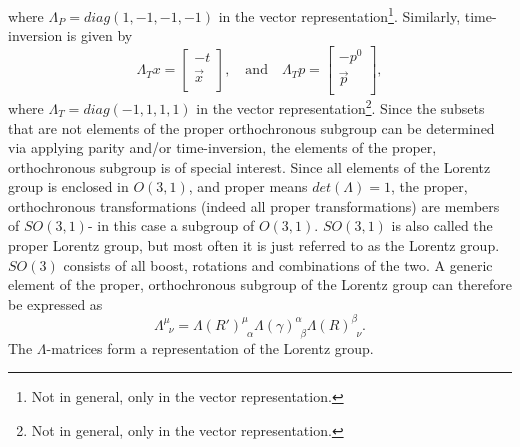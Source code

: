 where $\Lambda_P=diag(1,-1,-1,-1)$ in the vector representation\footnote{Not in general, only in the vector representation.}. Similarly, time-inversion is given by
\begin{equation}
	\Lambda_T x=\begin{bmatrix}
		-t\\
		\vec{x}\\
	\end{bmatrix}, \quad \text{and} \quad  \Lambda_Tp=\begin{bmatrix}
		-p^0\\
		\vec{p}\\
	\end{bmatrix},
\end{equation} 
where $\Lambda_T=diag(-1,1,1,1)$ in the vector representation\footnote{Not in general, only in the vector representation.}. Since the subsets that are not elements of the proper orthochronous subgroup can be determined via applying parity and/or time-inversion, the elements of the proper, orthochronous subgroup is of special interest. Since all elements of the Lorentz group is enclosed in $O(3,1)$, and proper means $det(\Lambda)=1$, the proper, orthochronous transformations (indeed all proper transformations) are members of $SO(3,1)$- in this case a subgroup of $O(3,1)$. $SO(3,1)$ is also called the proper Lorentz group, but most often it is just referred to as the Lorentz group. $SO(3)$ consists of all boost, rotations and combinations of the two. A generic element of the proper, orthochronous subgroup of the Lorentz group can therefore be expressed as
\begin{equation}
	\Lambda^\mu_{\,\,\,\nu}=\Lambda(R')^\mu_{\,\,\,\alpha}\Lambda(\gamma)^\alpha_{\,\,\,\beta}\Lambda(R)^\beta_{\,\,\,\nu}.
\end{equation} 
The $\Lambda$-matrices form a representation of the Lorentz group.

